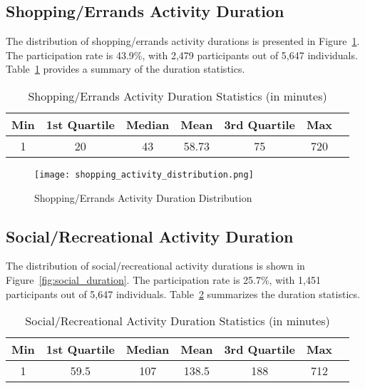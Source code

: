 \newpage
\subsection{Shopping/Errands Activity Duration}
The distribution of shopping/errands activity durations is presented in Figure~\ref{fig:shopping_duration}. The participation rate is 43.9\%, with 2,479 participants out of 5,647 individuals. Table~\ref{tab:shopping_stats} provides a summary of the duration statistics.

\vspace{1cm}

\begin{table}[h!]
    \centering
    \caption{Shopping/Errands Activity Duration Statistics (in minutes)}
    \label{tab:shopping_stats}
    \begin{tabular}{@{}ccccccc@{}}
        \toprule
        Min & 1st Quartile & Median & Mean   & 3rd Quartile & Max \\ 
        \midrule
        1   & 20           & 43     & 58.73  & 75           & 720 \\ 
        \bottomrule
    \end{tabular}
\end{table}

\begin{figure}[h!]
    \centering
    \texttt{[image: shopping\_activity\_distribution.png]}
    \caption{Shopping/Errands Activity Duration Distribution}
    \label{fig:shopping_duration}
\end{figure}



\newpage
\subsection{Social/Recreational Activity Duration}
The distribution of social/recreational activity durations is shown in Figure~\ref{fig:social_duration}. The participation rate is 25.7\%, with 1,451 participants out of 5,647 individuals. Table~\ref{tab:social_stats} summarizes the duration statistics.

\vspace{1cm}


\begin{table}[h!]
    \centering
    \caption{Social/Recreational Activity Duration Statistics (in minutes)}
    \label{tab:social_stats}
    \begin{tabular}{@{}ccccccc@{}}
        \toprule
        Min & 1st Quartile & Median & Mean   & 3rd Quartile & Max \\ 
        \midrule
        1   & 59.5         & 107    & 138.5  & 188          & 712 \\ 
        \bottomrule
    \end{tabular}
\end{table}

